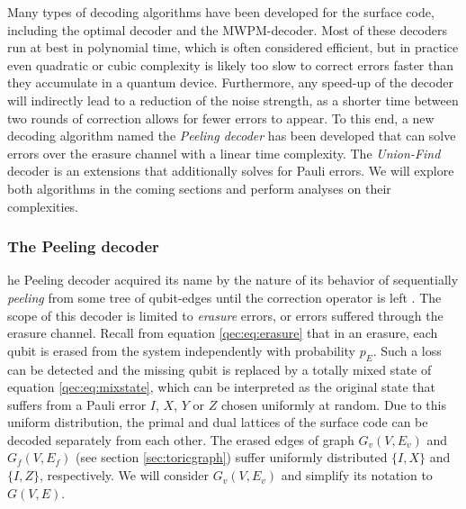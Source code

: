 Many types of decoding algorithms have been developed for the surface code, including the optimal decoder and the MWPM-decoder. Most of these decoders run at best in polynomial time, which is often considered efficient, but in practice even quadratic or cubic complexity is likely too slow to correct errors faster than they accumulate in a quantum device. Furthermore, any speed-up of the decoder will indirectly lead to a reduction of the noise strength, as a shorter time between two rounds of correction allows for fewer errors to appear. To this end, a new decoding algorithm named the \emph{Peeling decoder} has been developed that can solve errors over the erasure channel with a linear time complexity. The \emph{Union-Find} decoder is an extensions that additionally solves for Pauli errors. We will explore both algorithms in the coming sections and perform analyses on their complexities. 

\subsubsection{The Peeling decoder}
he Peeling decoder acquired its name by the nature of its behavior of sequentially \emph{peeling} from some tree of qubit-edges until the correction operator is left \cite{delfosse2017linear}. The scope of this decoder is limited to \emph{erasure} errors, or errors suffered through the erasure channel. Recall from equation \ref{qec:eq:erasure} that in an erasure, each qubit is erased from the system independently with probability $p_E$. Such a loss can be detected and the missing qubit is replaced by a totally mixed state of equation \ref{qec:eq:mixstate}, which can be interpreted as the original state that suffers from a Pauli error $I$, $X$, $Y$ or $Z$ chosen uniformly at random. Due to this uniform distribution, the primal and dual lattices of the surface code can be decoded separately from each other. The erased edges of graph $G_v(V,E_v)$ and $G_f(V,E_f)$ (see section \ref{sec:toricgraph}) suffer uniformly distributed $\{I,X\}$ and $\{I,Z\}$, respectively. We will consider $G_v(V,E_v)$ and simplify its notation to $G(V,E)$. 


